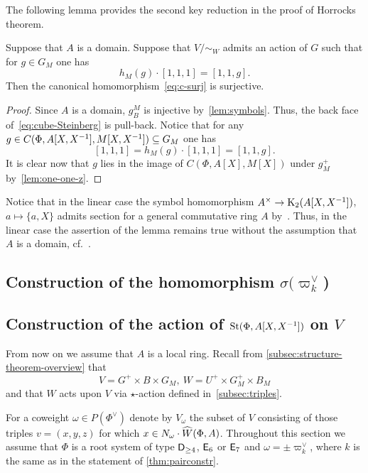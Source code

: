 The following lemma provides the second key reduction in the proof of Horrocks theorem.
\begin{lemma}
    Suppose that $A$ is a domain.
    Suppose that $V/\sim_W$ admits an action of $G$ such that
      for $g \in G_M$ one has \[ h_M(g) \cdot [1, 1, 1] = [1, 1, g]. \]
    Then the canonical homomorphism~\eqref{eq:c-surj} is surjective.
\end{lemma}
\begin{proof}
  Since $A$ is a domain, $g^M_B$ is injective by~\cref{lem:symbols}.
    Thus, the back face of~\eqref{eq:cube-Steinberg} is pull-back.
  Notice that for any $g \in C(\Phi, A[X, X^{-1}], M[X, X^{-1}]) \subseteq G_M$ one has
    \[ [1, 1, 1] = h_M(g) \cdot [1, 1, 1] = [1, 1, g].\]
  It is clear now that $g$ lies in the image of $C(\Phi, A[X], M[X])$ under $g^+_M$ by~\cref{lem:one-one-z}.
\end{proof}

\begin{rem}
    Notice that in the linear case the symbol homomorphism $A^\times \to \operatorname{K}_2(A[X, X^{-1}])$, $a \mapsto \{a, X\}$ admits section
     for a general commutative ring $A$ by~\cite{Wa71}.
    Thus, in the linear case the assertion of the lemma remains true without the assumption that $A$ is a domain, cf.~\cite[Lemma~3.1g]{Tu83}.
\end{rem}

\subsection{Construction of the homomorphism $\sigma(\varpi_k^\vee$)} \label{subsec:construction-sigma}


\subsection{Construction of the action of $\operatorname{St}(\Phi, A[X, X^{-1}])$ on $V$} \label{sec:construction-delta}
From now on we assume that $A$ is a local ring.
Recall from \cref{subsec:structure-theorem-overview} that \[V = G^+ \times B \times G_M,\ W = U^+ \times G_M^+ \times B_M\]
and that $W$ acts upon $V$ via $\star$-action defined in~\cref{subsec:triples}.

For a coweight $\omega \in P(\Phi^\vee)$ denote by $V_\omega$ the subset of $V$ consisting of those triples $v = (x, y, z)$ for which $x \in N_\omega\cdot \widehat{W}(\Phi, A)$.
Throughout this section we assume that $\Phi$ is a root system of type $\mathsf{D}_{\geq 4}$, $\mathsf{E}_6$ or $\mathsf{E}_7$
 and $\omega = \pm \varpi_k^\vee$, where $k$ is the same as in the statement of \cref{thm:pairconstr}.

